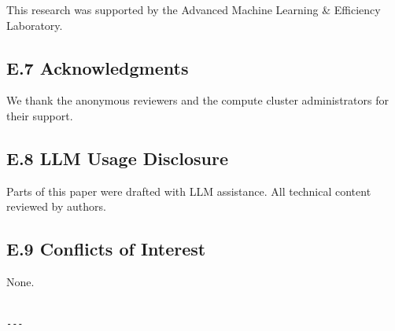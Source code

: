 This research was supported by the Advanced Machine Learning \& Efficiency Laboratory.

\subsection{E.7 Acknowledgments}

We thank the anonymous reviewers and the compute cluster administrators for their support.

\subsection{E.8 LLM Usage Disclosure}

Parts of this paper were drafted with LLM assistance. All technical content 
reviewed by authors.

\subsection{E.9 Conflicts of Interest}

None.
\begin{lstlisting}

---
\end{lstlisting}